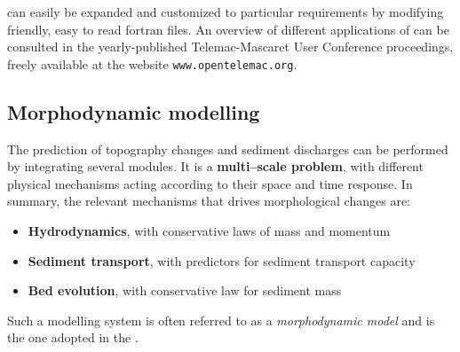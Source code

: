
\gaia{} can easily be expanded and customized to particular requirements by modifying friendly,
easy to read fortran files. An overview of different applications of \gaia{} can be consulted in the yearly-published Telemac-Mascaret User Conference proceedings, freely available at the website \texttt{www.opentelemac.org}.

%
%
%
%
%
%
%
%

%

\subsection{Morphodynamic modelling}
The prediction of topography changes and sediment discharges can be performed by integrating several modules. It is a {\bf multi--scale problem}, with different physical mechanisms acting according to their space and time response. In summary, the relevant mechanisms that drives morphological changes are:
\begin{itemize}
         \item {\bf Hydrodynamics}, with conservative laws of mass and momentum
         \item {\bf Sediment transport}, with predictors for sediment transport capacity
         \item {\bf Bed evolution}, with conservative law for sediment mass
\end{itemize}
\noindent
Such a modelling system is often referred to as a \emph{morphodynamic model} and is the one adopted in the \telemacsystem{}.

